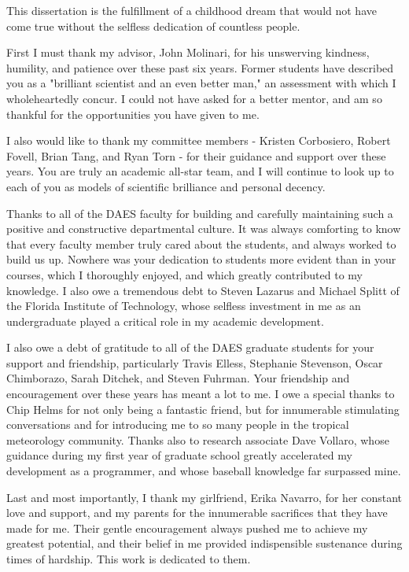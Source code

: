  


This dissertation is the fulfillment of a childhood dream that would not have come true without the selfless dedication of countless people.

First I must thank my advisor, John Molinari, for his unswerving kindness, humility, and patience over these past six years.  
Former students have described you as a "brilliant scientist and an even better man," an assessment with which I wholeheartedly concur.  
I could not have asked for a better mentor, and am so thankful for the opportunities you have given to me.

I also would like to thank my committee members - Kristen Corbosiero, Robert Fovell, Brian Tang, and Ryan Torn - for their guidance and support over these years.  
You are truly an academic all-star team, and I will continue to look up to each of you as models of scientific brilliance and personal decency.

Thanks to all of the DAES faculty for building and carefully maintaining such a positive and constructive departmental culture.  
It was always comforting to know that every faculty member truly cared about the students, and always worked to build us up.  
Nowhere was your dedication to students more evident than in your courses, which I thoroughly enjoyed, and which greatly contributed to my knowledge.  
I also owe a tremendous debt to Steven Lazarus and Michael Splitt of the Florida Institute of Technology, whose selfless investment in me as an undergraduate played a critical role in my academic development.

I also owe a debt of gratitude to all of the DAES graduate students for your support and friendship, particularly Travis Elless, Stephanie Stevenson, Oscar Chimborazo, Sarah Ditchek, and Steven Fuhrman.  
Your friendship and encouragement over these years has meant a lot to me. I owe a special thanks to Chip Helms for not only being a fantastic friend, but for innumerable stimulating conversations and for introducing me to so many people in the tropical meteorology community.  
Thanks also to research associate Dave Vollaro, whose guidance during my first year of graduate school greatly accelerated my development as a programmer, and whose baseball knowledge far surpassed mine.

Last and most importantly, I thank my girlfriend, Erika Navarro, for her constant love and support, and my parents for the innumerable sacrifices that they have made for me.  
Their gentle encouragement always pushed me to achieve my greatest potential, and their belief in me provided indispensible sustenance during times of hardship. 
This work is dedicated to them.
